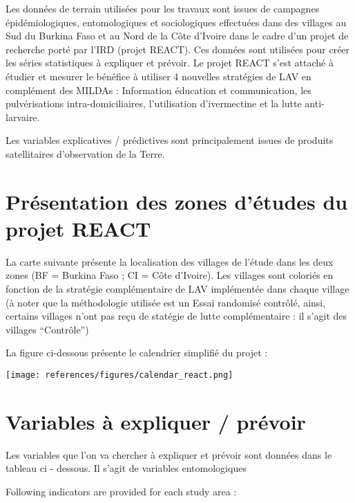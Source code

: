 \documentclass[]{article}
\begin{document}
Les données de terrain utilisées pour les travaux sont issues de
campagnes épidémiologiques, entomologiques et sociologiques effectuées
dans des villages au Sud du Burkina Faso et au Nord de la Côte d'Ivoire
dans le cadre d'un projet de recherche porté par l'IRD (projet REACT).
Ces données sont utilisées pour créer les séries statistiques à
expliquer et prévoir. Le projet REACT s'est attaché à étudier et mesurer
le bénéfice à utiliser 4 nouvelles stratégies de LAV en complément des
MILDAs : Information éducation et communication, les pulvérisations
intra-domiciliaires, l'utilisation d'ivermectine et la lutte
anti-larvaire.

Les variables explicatives / prédictives sont principalement issues de
produits satellitaires d'observation de la Terre.

\hypertarget{presentation-des-zones-detudes-du-projet-react}{%
\section{Présentation des zones d'études du projet
REACT}\label{presentation-des-zones-detudes-du-projet-react}}

La carte suivante présente la localisation des villages de l'étude dans
les deux zones (BF = Burkina Faso ; CI = Côte d'Ivoire). Les villages
sont coloriés en fonction de la stratégie complémentaire de LAV
implémentée dans chaque village (à noter que la méthodologie utilisée
est un Essai randomisé contrôlé, ainsi, certains villages n'ont pas reçu
de statégie de lutte complémentaire : il s'agit des villages
``Contrôle'')

La figure ci-dessous présente le calendrier simplifié du projet :

\texttt{[image: references/figures/calendar\_react.png]}

\hypertarget{variables-a-expliquer-prevoir}{%
\section{Variables à expliquer /
prévoir}\label{variables-a-expliquer-prevoir}}

Les variables que l'on va chercher à expliquer et prévoir sont données
dans le tableau ci - dessous. Il s'agit de variables entomologiques

Following indicators are provided for each study area :
\end{document}
